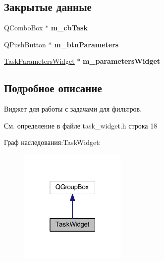 \subsection*{Закрытые данные}
\begin{DoxyCompactItemize}
\item 
\hypertarget{class_task_widget_afbdad5a3494264c0edcd3fc2444bb5bb}{}\label{class_task_widget_afbdad5a3494264c0edcd3fc2444bb5bb} 
Q\+Combo\+Box $\ast$ {\bfseries m\+\_\+cb\+Task}
\item 
\hypertarget{class_task_widget_a150a4b841480dcce86914f04635812ef}{}\label{class_task_widget_a150a4b841480dcce86914f04635812ef} 
Q\+Push\+Button $\ast$ {\bfseries m\+\_\+btn\+Parameters}
\item 
\hypertarget{class_task_widget_a5feaeeed716a49df8022b6b712c69840}{}\label{class_task_widget_a5feaeeed716a49df8022b6b712c69840} 
\hyperlink{class_task_parameters_widget}{Task\+Parameters\+Widget} $\ast$ {\bfseries m\+\_\+parameters\+Widget}
\end{DoxyCompactItemize}


\subsection{Подробное описание}
Виджет для работы с задачами для фильтров. 

См. определение в файле task\+\_\+widget.\+h строка 18



Граф наследования\+:Task\+Widget\+:
\nopagebreak
\begin{figure}[H]
\begin{center}
\leavevmode
\includegraphics[width=148pt]{class_task_widget__inherit__graph}
\end{center}
\end{figure}


